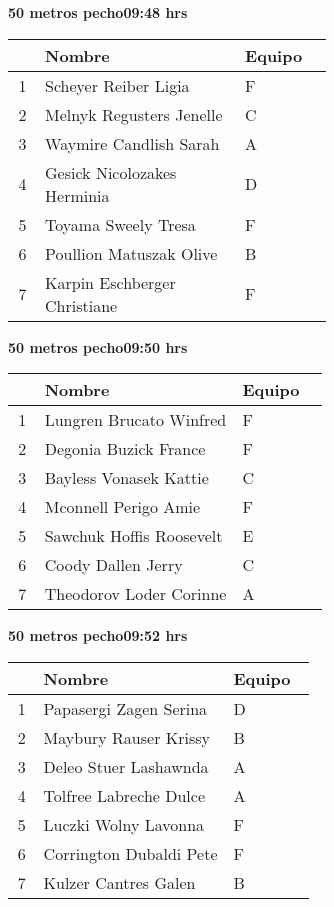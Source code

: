 \begin{minipage}{0.95\linewidth}
\begin{center}
\textbf{
50 metros pecho\hspace{1cm}09:48 hrs}
\end{center}
\begin{tabular}{cp{0.63\linewidth}l}
\hline
& \textbf{Nombre} & \textbf{Equipo} \\ \hline
1 & Scheyer Reiber Ligia & F \\ 
2 & Melnyk Regusters Jenelle & C \\ 
3 & Waymire Candlish Sarah & A \\ 
4 & Gesick Nicolozakes Herminia & D \\ 
5 & Toyama Sweely Tresa & F \\ 
6 & Poullion Matuszak Olive & B \\ 
7 & Karpin Eschberger Christiane & F \\ 
\end{tabular}
\end{minipage}
\begin{minipage}{0.95\linewidth}
\begin{center}
\textbf{
50 metros pecho\hspace{1cm}09:50 hrs}
\end{center}
\begin{tabular}{cp{0.63\linewidth}l}
\hline
& \textbf{Nombre} & \textbf{Equipo} \\ \hline
1 & Lungren Brucato Winfred & F \\ 
2 & Degonia Buzick France & F \\ 
3 & Bayless Vonasek Kattie & C \\ 
4 & Mconnell Perigo Amie & F \\ 
5 & Sawchuk Hoffis Roosevelt & E \\ 
6 & Coody Dallen Jerry & C \\ 
7 & Theodorov Loder Corinne & A \\ 
\end{tabular}
\end{minipage}
\begin{minipage}{0.95\linewidth}
\begin{center}
\textbf{
50 metros pecho\hspace{1cm}09:52 hrs}
\end{center}
\begin{tabular}{cp{0.63\linewidth}l}
\hline
& \textbf{Nombre} & \textbf{Equipo} \\ \hline
1 & Papasergi Zagen Serina & D \\ 
2 & Maybury Rauser Krissy & B \\ 
3 & Deleo Stuer Lashawnda & A \\ 
4 & Tolfree Labreche Dulce & A \\ 
5 & Luczki Wolny Lavonna & F \\ 
6 & Corrington Dubaldi Pete & F \\ 
7 & Kulzer Cantres Galen & B \\ 
\end{tabular}
\end{minipage}
